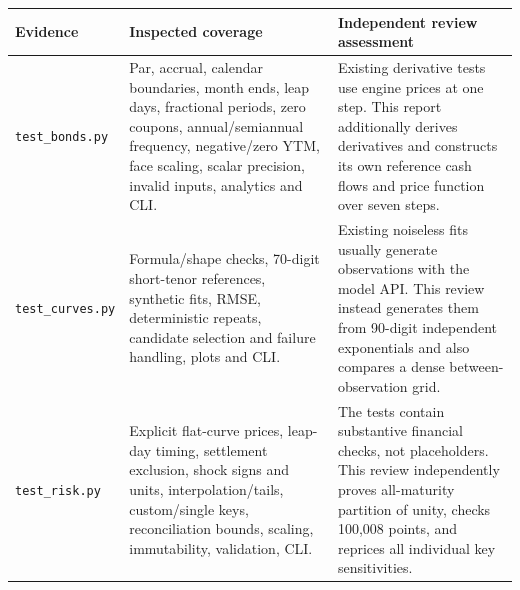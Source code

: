 \documentclass[12pt,a4paper]{article}
\begin{document}
\small
\begin{longtable}{@{}p{}p{}p{}@{}}
\toprule
Evidence & Inspected coverage & Independent review assessment\\
\midrule
\endhead
\texttt{test\_bonds.py} &
Par, accrual, calendar boundaries, month ends, leap days, fractional periods,
zero coupons, annual/semiannual frequency, negative/zero YTM, face scaling,
scalar precision, invalid inputs, analytics and CLI. &
Existing derivative tests use engine prices at one step.
This report additionally derives derivatives and constructs its own
reference cash flows and price function over seven steps.\\
\texttt{test\_curves.py} &
Formula/shape checks, 70-digit short-tenor references, synthetic fits,
RMSE, deterministic repeats, candidate selection and failure handling,
plots and CLI. &
Existing noiseless fits usually generate observations with the model API.
This review instead generates them from 90-digit independent exponentials
and also compares a dense between-observation grid.\\
\texttt{test\_risk.py} &
Explicit flat-curve prices, leap-day timing, settlement exclusion,
shock signs and units, interpolation/tails, custom/single keys,
reconciliation bounds, scaling, immutability, validation, CLI. &
The tests contain substantive financial checks, not placeholders.
This review independently proves all-maturity partition of unity,
checks 100,008 points, and reprices all individual key sensitivities.\\
\bottomrule
\end{longtable}
\normalsize
\end{document}
